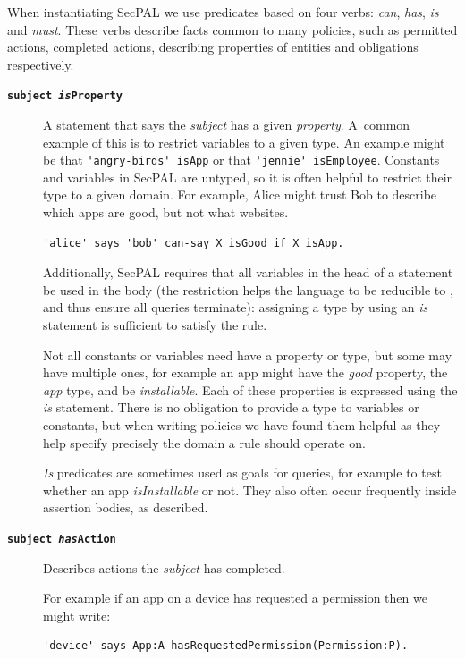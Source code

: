 \documentclass[thesis.tex]{subfiles}
\begin{document}
When instantiating SecPAL we use predicates based on four verbs: \emph{can},
\emph{has}, \emph{is} and \emph{must}.  These verbs describe facts common to
many policies, such as permitted actions, completed actions, describing
properties of entities and obligations respectively.  
%
\begin{description}
\item[\bfseries\texttt{subject \emph{is}Property}]
  A statement that says the \emph{subject} has a given \emph{property}.
  A~common example of this is to restrict variables to a given type.
  An example might be that \lstinline!'angry-birds' isApp! or that \lstinline!'jennie' isEmployee!.
  Constants and variables in SecPAL are untyped, so it is
  often helpful to restrict their type to a given domain.  For example, Alice
  might trust Bob to describe which apps are good, but not what websites.
  \begin{lstlisting}
'alice' says 'bob' can-say X isGood if X isApp.
  \end{lstlisting}
  Additionally, SecPAL requires that all variables in the head of a
  statement be used in the body (the restriction helps the language to
  be reducible to \datalogc{}, and thus ensure all
  queries terminate): assigning a type by using an \emph{is} statement
  is sufficient to satisfy the rule.

  Not all constants or variables need have a property or type, but
  some may have multiple ones, for example an app might have the
  \emph{good} property, the \emph{app} type, and be \emph{installable}.
  Each of these properties is expressed using the \emph{is} statement.
  There is no obligation to provide a type to variables or constants,
  but when writing policies we have found them helpful as they help
  specify precisely the domain a rule should operate on.

  \emph{Is} predicates are sometimes used as goals for queries, for
  example to test whether an app \emph{isInstallable} or not.  They also
  often occur frequently inside assertion bodies, as described.

\item[\bfseries\texttt{subject \emph{has}Action}]
  Describes actions the \emph{subject} has completed.

  For example if an app on a device has requested a permission then we might write:

  \begin{lstlisting}
'device' says App:A hasRequestedPermission(Permission:P).
  \end{lstlisting}


\end{description}
\end{document}
